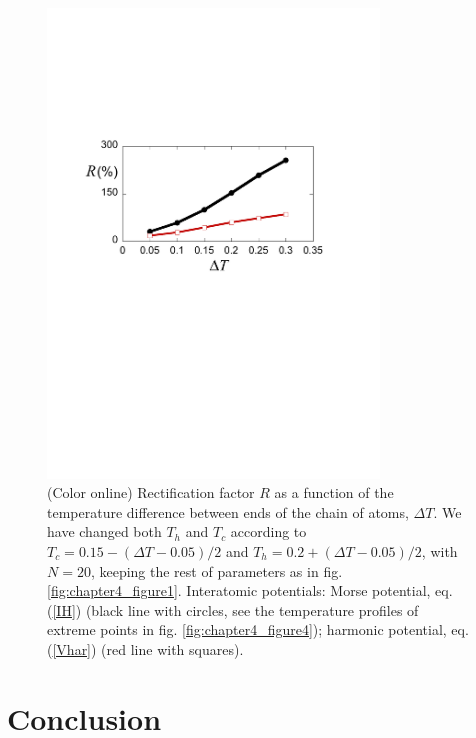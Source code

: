 \begin{figure}
\centering
\includegraphics[width=8.8cm]{Figures/FIG5new.pdf}
\caption{(Color online) Rectification factor $R$ as a function of the temperature difference between ends of the chain of atoms, $\Delta T$.
We have changed both $T_h$ and $T_c$ according to $T_c=0.15-(\Delta T-0.05)/2$ and $T_h=0.2+(\Delta T-0.05)/2$, with $N=20$,  keeping the rest of parameters as in fig. \ref{fig:chapter4_figure1}.
Interatomic potentials: Morse potential, eq. (\ref{IH}) (black line with circles, see the temperature profiles of extreme points in fig. \ref{fig:chapter4_figure4}); harmonic potential, eq. (\ref{Vhar}) (red line with squares).}
\label{fig:chapter4_figure5}
\end{figure}


\section{Conclusion\label{sec:chapter4_conclusions}}

